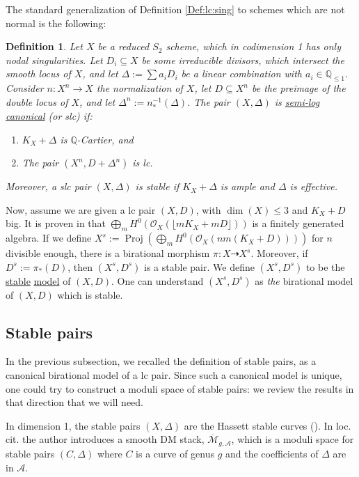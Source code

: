 \documentclass[11pt]{amsart}
\newcommand{\cO}{\mathcal{O}}
\newtheorem{Def}[theorem]{Definition}
\theoremstyle{definition}
\begin{document}
The standard generalization of Definition \ref{Def:lc:sing} to schemes which are not normal is the following:
\begin{Def}
 Let $X$ be a reduced $S_2$ scheme, which in codimension 1 has only nodal singularities. Let $D_i \subseteq X$ be
 some irreducible divisors, which intersect the smooth locus of $X$, and let $\Delta:=\sum a_i D_i $ be a linear combination
 with $a_i \in \mathbb{Q}_{\le 1}$. Consider $n:X^n \to X$ the normalization of $X$, let $D \subseteq X^n$ be the preimage of the double locus of $X$,
 and let $\Delta^n:=n_*^{-1}(\Delta)$.
 The pair $(X,\Delta)$ is \underline{semi-log canonical} (or slc) if:
 \begin{enumerate}
  \item $K_X+\Delta$ is $\mathbb{Q}$-Cartier, and
  \item The pair $(X^n,D+\Delta^n)$ is lc.
 \end{enumerate}
 Moreover, a slc pair $(X,\Delta)$ is stable if $K_X+\Delta$ is ample and $\Delta$ is effective.
\end{Def}
Now, assume we are given a lc pair $(X,D)$, with $\dim(X) \le 3$ and $K_X+D$ big. It is proven in \cite{KMMcK} that
$\bigoplus_m H^0(\cO_X(\lfloor m K_X+mD \rfloor))$ is a finitely generated algebra. If we define
$X^s:=\operatorname{Proj}(\bigoplus_m H^0(\cO_X(n m (K_X+D))))$ for $n$ divisible enough, there is a birational morphism
$\pi:X \dashrightarrow X^s$. Moreover, if $D^s:=\pi_*(D)$, then $(X^s,D^s)$ is a stable pair. We define $(X^s,D^s)$ to be the \underline{stable} \underline{model} of $(X,D)$.
One can understand $(X^s,D^s)$ as \emph{the} birational model of $(X,D)$ which is stable.
\subsection{Stable pairs}\label{Subsection:stable:pairs} In the previous subsection,
we recalled the definition of stable pairs, as a canonical birational model of a lc pair. 
Since such a canonical model is unique, one could try to construct a moduli space of stable pairs: we review the results in that direction that we will need.

In dimension 1, the stable pairs $(X,\Delta)$ are the Hassett stable curves (\cite{Hassett}).
In loc. cit. the author introduces a
smooth
DM stack, $\overline{\mathcal{M}}_{g,\mathcal{A}}$, which is a moduli space for stable pairs $(C,\Delta)$ where $C$ is a curve of genus $g$ and the coefficients of $\Delta$ are in $\mathcal{A}$.
\end{document}
